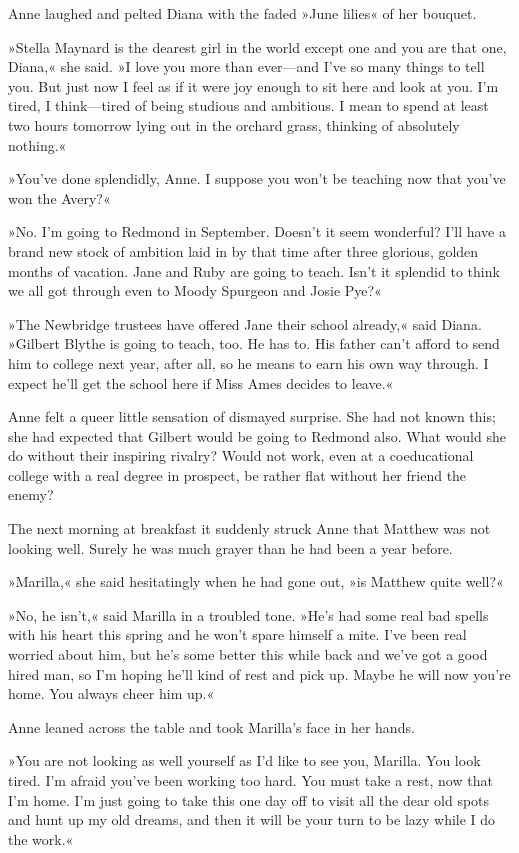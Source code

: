 Anne laughed and pelted Diana with the faded »June lilies« of her bouquet.

»Stella Maynard is the dearest girl in the world except one and you are that one, Diana,« she said. »I love you more than ever—and I’ve so many things to tell you. But just now I feel as if it were joy enough to sit here and look at you. I’m tired, I think—tired of being studious and ambitious. I mean to spend at least two hours tomorrow lying out in the orchard grass, thinking of absolutely nothing.«

»You’ve done splendidly, Anne. I suppose you won’t be teaching now that you’ve won the Avery?«

»No. I’m going to Redmond in September. Doesn’t it seem wonderful? I’ll have a brand new stock of ambition laid in by that time after three glorious, golden months of vacation. Jane and Ruby are going to teach. Isn’t it splendid to think we all got through even to Moody Spurgeon and Josie Pye?«

»The Newbridge trustees have offered Jane their school already,« said Diana. »Gilbert Blythe is going to teach, too. He has to. His father can’t afford to send him to college next year, after all, so he means to earn his own way through. I expect he’ll get the school here if Miss Ames decides to leave.«

Anne felt a queer little sensation of dismayed surprise. She had not known this; she had expected that Gilbert would be going to Redmond also. What would she do without their inspiring rivalry? Would not work, even at a coeducational college with a real degree in prospect, be rather flat without her friend the enemy?

The next morning at breakfast it suddenly struck Anne that Matthew was not looking well. Surely he was much grayer than he had been a year before.

»Marilla,« she said hesitatingly when he had gone out, »is Matthew quite well?«

»No, he isn’t,« said Marilla in a troubled tone. »He’s had some real bad spells with his heart this spring and he won’t spare himself a mite. I’ve been real worried about him, but he’s some better this while back and we’ve got a good hired man, so I’m hoping he’ll kind of rest and pick up. Maybe he will now you’re home. You always cheer him up.«

Anne leaned across the table and took Marilla’s face in her hands.

»You are not looking as well yourself as I’d like to see you, Marilla. You look tired. I’m afraid you’ve been working too hard. You must take a rest, now that I’m home. I’m just going to take this one day off to visit all the dear old spots and hunt up my old dreams, and then it will be your turn to be lazy while I do the work.«

